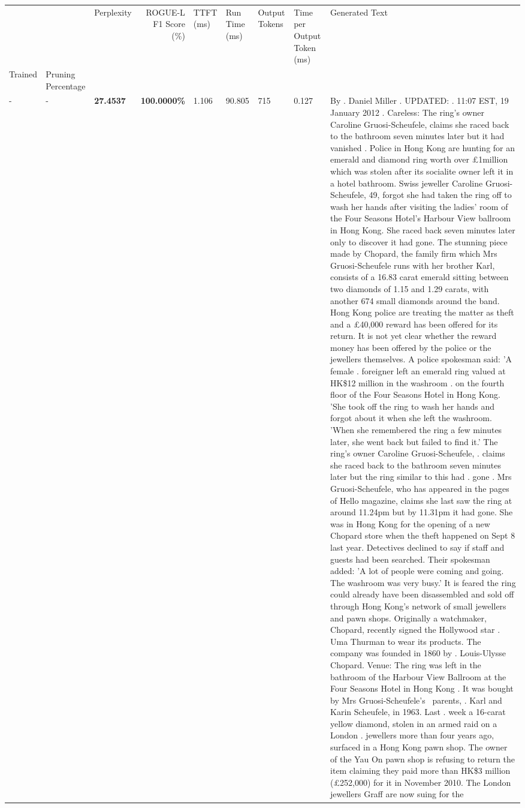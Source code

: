 \begin{table}[H]
\label{tab:evaluation-pipeline-2}
\begin{tabular}{lllrlllll}
\toprule
 &  & Perplexity & ROGUE-L F1 Score (\%) & TTFT (ms) & Run Time (ms) & Output Tokens & Time per Output Token (ms) & Generated Text \\
Trained & Pruning Percentage &  &  &  &  &  &  &  \\
\midrule
- & - & \bfseries 27.4537 & \bfseries 100.0000\% & 1.106 & 90.805 & 715 & 0.127 & By . Daniel Miller . UPDATED: . 11:07 EST, 19 January 2012 . Careless: The ring's owner Caroline Gruosi-Scheufele, claims she raced back to the bathroom seven minutes later but it had vanished . Police in Hong Kong are hunting for an emerald and diamond ring worth over £1million which was stolen after its socialite owner left it in a hotel bathroom. Swiss jeweller Caroline Gruosi-Scheufele, 49, forgot she had taken the ring off to wash her hands after visiting the ladies' room of the Four Seasons Hotel's Harbour View ballroom in Hong Kong. She raced back seven minutes later only to discover it had gone. The stunning piece made by Chopard, the family firm which Mrs Gruosi-Scheufele runs with her brother Karl, consists of a 16.83 carat emerald sitting between two diamonds of 1.15 and 1.29 carats, with another 674 small diamonds around the band. Hong Kong police are treating the matter as theft and a £40,000 reward has been offered for its return. It is not yet clear whether the reward money has been offered by the police or the jewellers themselves. A police spokesman said: 'A female . foreigner left an emerald ring valued at HK\$12 million in the washroom . on the fourth floor of the Four Seasons Hotel in Hong Kong. 'She took off the ring to wash her hands and forgot about it when she left the washroom. 'When she remembered the ring a few minutes later, she went back but failed to find it.' The ring's owner Caroline Gruosi-Scheufele, . claims she raced back to the bathroom seven minutes later but the ring similar to this had . gone . Mrs Gruosi-Scheufele, who has appeared in the pages of Hello magazine, claims she last saw the ring at around 11.24pm but by 11.31pm it had gone. She was in Hong Kong for the opening of a new Chopard store when the theft happened on Sept 8 last year. Detectives declined to say if staff and guests had been searched. Their spokesman added: 'A lot of people were coming and going. The washroom was very busy.' It is feared the ring could already have been disassembled and sold off through Hong Kong's network of small jewellers and pawn shops. Originally a watchmaker, Chopard, recently signed the Hollywood star . Uma Thurman to wear its products. The company was founded in 1860 by . Louis-Ulysse Chopard. Venue: The ring was left in the bathroom of the Harbour View Ballroom at the Four Seasons Hotel in Hong Kong . It was bought by Mrs Gruosi-Scheufele's  parents, . Karl and Karin Scheufele, in 1963. Last . week a 16-carat yellow diamond, stolen in an armed raid on a London . jewellers more than four years ago, surfaced in a Hong Kong pawn shop. The owner of the Yau On pawn shop is refusing to return the item claiming they paid more than HK\$3 million (£252,000) for it in November 2010. The London jewellers Graff are now suing for the 
\end{tabular}
\end{table}
